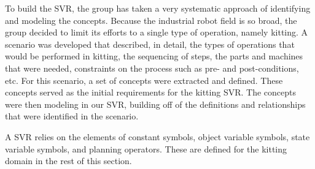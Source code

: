 \documentclass[a4paper, 10pt, conference]{ieeeconf}      %
\begin{document}
To build the SVR, the group has taken a very systematic approach of identifying and modeling the concepts. Because the industrial robot field is so broad, the group decided to limit its efforts to a single type of operation, namely kitting. A scenario was developed that described, in detail, the types of operations that would be performed in kitting, the sequencing of steps, the parts and machines that were needed, constraints on the process such as pre- and post-conditions, etc. For this scenario, a set of concepts were extracted and defined. These concepts served as the initial requirements for the kitting SVR. The concepts were then modeling in our SVR, building off of the definitions and relationships that were identified in the scenario.

A SVR relies on the elements of constant symbols, object variable symbols, state variable symbols, and planning operators. These are defined for the kitting domain in the rest of this section.
\end{document}
